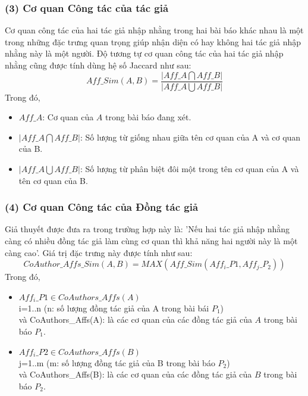 \subsubsection*{(3) Cơ quan Công tác của tác giả}
Cơ quan công tác của hai tác giả nhập nhằng trong hai bài báo khác nhau là một trong những đặc trưng quan trọng giúp nhận diện có hay không hai tác giả nhập nhằng này là một người. Độ tương tự cơ quan công tác của hai tác giả nhập nhằng cũng được tính dùng hệ số Jaccard như sau:
\begin{equation}
Aff\_Sim(A,B) = \displaystyle\frac{|Aff\_A \bigcap Aff\_B|}{|Aff\_A \bigcup Aff\_B|}
\end{equation}
Trong đó,
\begin{itemize}
\item $Aff\_A$: Cơ quan của $A$ trong bài báo đang xét.
\item $|Aff\_A \bigcap Aff\_B|$: Số lượng từ giống nhau giữa tên cơ quan của A và cơ quan của B.
\item $|Aff\_A \bigcup Aff\_B|$: Số lượng từ phân biệt đôi một trong tên cơ quan của A và tên cơ quan của B.
\end{itemize}

\subsubsection*{(4) Cơ quan Công tác của Đồng tác giả}
Giả thuyết được đưa ra trong trường hợp này là: 'Nếu hai tác giả nhập nhằng càng có nhiều đồng tác giả làm cùng cơ quan thì khả năng hai người này là một càng cao'. Giá trị đặc trưng này được tính như sau:
\begin{equation}
CoAuthor\_Affs\_Sim(A,B) = MAX(Aff\_Sim(Aff_{i}\_P{1},Aff_{j}\_P_{2}))
\end{equation}
Trong đó,
\begin{itemize}
\item $Aff_{i}\_P{1}\in {CoAuthors\_Affs(A)}$\\
i=1..n (n: số lượng đồng tác giả của A trong bài bái $P_{1}$) \\
và CoAuthors\_Affs(A): là các cơ quan của các đồng tác giả của $A$ trong bài báo $P_{1}$.
\item $Aff_{i}\_P{2}\in {CoAuthors\_Affs(B)}$\\
j=1..m (m: số lượng đồng tác giả của B trong bài báo $P_{2}$) \\
và CoAuthors\_Affs(B): là các cơ quan của các đồng tác giả của $B$ trong bài báo $P_{2}$.
\end{itemize}


